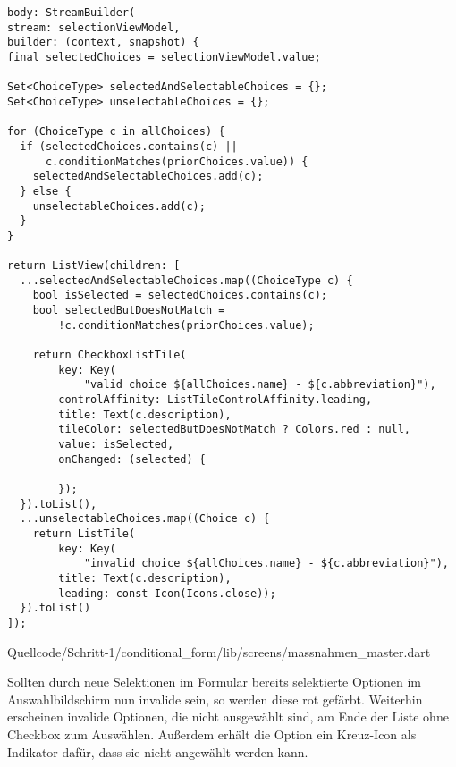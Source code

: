 \ifIncludeFigures
\begin{listing}[htbp]
  \renewcommand\theFancyVerbLine{%
    \ifnum\value{FancyVerbLine}=121
    \setcounter{FancyVerbLine}{131}
    \tiny\ldots
    \else
    \tiny\arabic{FancyVerbLine}%
    \fi
  }
  \begin{verbatim}
body: StreamBuilder(
stream: selectionViewModel,
builder: (context, snapshot) {
final selectedChoices = selectionViewModel.value;

Set<ChoiceType> selectedAndSelectableChoices = {};
Set<ChoiceType> unselectableChoices = {};

for (ChoiceType c in allChoices) {
  if (selectedChoices.contains(c) ||
      c.conditionMatches(priorChoices.value)) {
    selectedAndSelectableChoices.add(c);
  } else {
    unselectableChoices.add(c);
  }
}

return ListView(children: [
  ...selectedAndSelectableChoices.map((ChoiceType c) {
    bool isSelected = selectedChoices.contains(c);
    bool selectedButDoesNotMatch =
        !c.conditionMatches(priorChoices.value);

    return CheckboxListTile(
        key: Key(
            "valid choice ${allChoices.name} - ${c.abbreviation}"),
        controlAffinity: ListTileControlAffinity.leading,
        title: Text(c.description),
        tileColor: selectedButDoesNotMatch ? Colors.red : null,
        value: isSelected,
        onChanged: (selected) {

        });
  }).toList(),
  ...unselectableChoices.map((Choice c) {
    return ListTile(
        key: Key(
            "invalid choice ${allChoices.name} - ${c.abbreviation}"),
        title: Text(c.description),
        leading: const Icon(Icons.close));
  }).toList()
]);
\end{verbatim}
   {Quellcode/Schritt-1/conditional_form/lib/screens/massnahmen_master.dart}
  \label{lst:Schritt4selectedAndSelectableChoices}
\end{listing}
\fi









Sollten durch neue Selektionen im Formular bereits selektierte Optionen im Auswahlbildschirm nun invalide sein,
so werden diese rot gefärbt.
Weiterhin erscheinen invalide Optionen,
die nicht ausgewählt sind,
am Ende der Liste ohne Checkbox zum Auswählen.
Außerdem erhält die Option ein Kreuz-Icon als Indikator dafür,
dass sie nicht angewählt werden kann.

